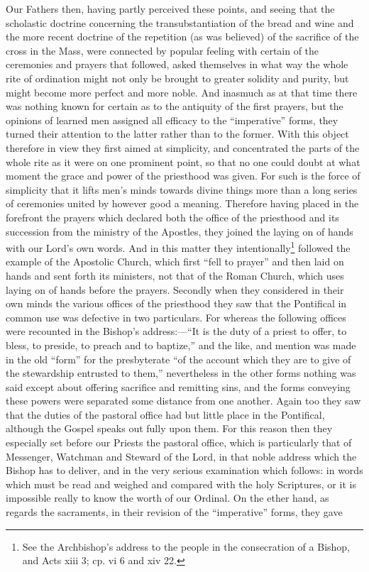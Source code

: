 Our Fathers then, having partly perceived these points, and seeing that the scholastic doctrine concerning the transubstantiation of the bread and wine and the more recent doctrine of the repetition (as was believed) of the sacrifice of the cross in the Mass, were connected by popular feeling with certain of the ceremonies and prayers that followed, asked themselves in what way the whole rite of ordination might not only be brought to greater solidity and purity, but might become more perfect and more noble. And inasmuch as at that time there was nothing known for certain as to the antiquity of the first prayers, but the opinions of learned men assigned all efficacy to the “imperative” forms, they turned their attention to the latter rather than to the former. With this object therefore in view they first aimed at simplicity, and concentrated the parts of the whole rite as it were on one prominent point, so that no one could doubt at what moment the grace and power of the priesthood was given. For such is the force of simplicity that it lifts men’s minds towards divine things more than a long series of ceremonies united by however good a meaning. Therefore having placed in the forefront the prayers which declared both the office of the priesthood and its succession from the ministry of the Apostles, they joined the laying on of hands with our Lord’s own words. And in this matter they intentionally\footnote{See the Archbishop’s address to the people in the consecration of a Bishop, and Acts xiii 3; cp. vi 6 and xiv 22.} followed the example of the Apostolic Church, which first “fell to prayer” and then laid on hands and sent forth its ministers, not that of the Roman Church, which uses laying on of hands before the prayers. Secondly when they considered in their own minds the various offices of the priesthood they saw that the Pontifical in common use was defective in two particulars. For whereas the following offices were recounted in the Bishop’s address:—“It is the duty of a priest to offer, to bless, to preside, to preach and to baptize,” and the like, and mention was made in the old “form” for the presbyterate “of the account which they are to give of the stewardship entrusted to them,” nevertheless in the other forms nothing was said except about offering sacrifice and remitting sins, and the forms conveying these powers were separated some distance from one another. Again too they saw that the duties of the pastoral office had but little place in the Pontifical, although the Gospel speaks out fully upon them. For this reason then they especially set before our Priests the pastoral office, which is particularly that of Messenger, Watchman and Steward of the Lord, in that noble address which the Bishop has to deliver, and in the very serious examination which follows: in words which must be read and weighed and compared with the holy Scriptures, or it is impossible really to know the worth of our Ordinal. On the ether hand, as regards the sacraments, in their revision of the “imperative” forms, they gave

